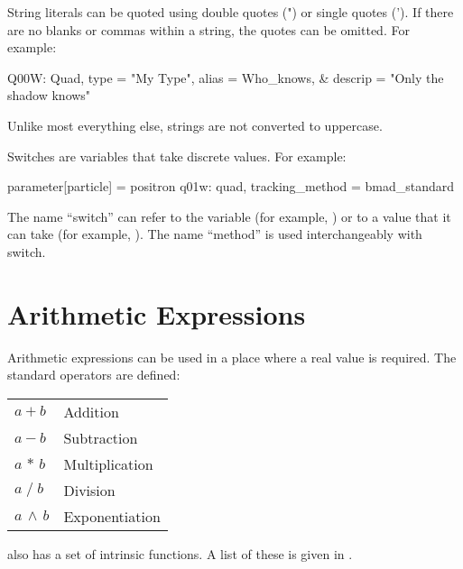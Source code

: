 String literals can be quoted using double quotes (") or single quotes ('). 
If there are no
blanks or commas within a string, the quotes can be omitted. For example:
\begin{example}
  Q00W: Quad, type = "My Type", alias = Who_knows, &
                                  descrip = "Only the shadow knows"
\end{example}
Unlike most everything else, strings are not converted to uppercase.

Switches are variables that take discrete values. For example:
\begin{example}
  parameter[particle] = positron          
  q01w: quad, tracking_method = bmad_standard 
\end{example}
The name ``switch'' can refer to the variable (for example,
) or to a value that it can take (for example,
). The name ``method'' is used interchangeably with switch.

\section{Arithmetic Expressions}

Arithmetic expressions can be used in a place where a real value is required.
The standard operators are defined: \hfil\break
\hspace*{0.15in}
\begin{tabular}{ll}
  $a + b$           & Addition        \\
  $a - b$           & Subtraction     \\
  $a \, \ast \, b$  & Multiplication  \\
  $a \; / \; b$     & Division        \\
  $a \, \land \, b$ & Exponentiation  \\
\end{tabular}
\bmad also has a set of intrinsic functions. A list of these is given
in .

